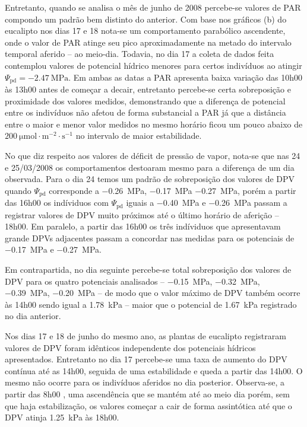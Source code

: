 \documentclass[a4paper, 12pt]{article}
\begin{document}
	Entretanto, quando se analisa o mês de junho de 2008 percebe-se valores de PAR compondo um padrão bem distinto do anterior. Com base nos gráficos (b) do eucalipto nos dias 17 e 18 nota-se um comportamento parabólico ascendente, onde o valor de PAR atinge seu pico aproximadamente na metado do intervalo temporal aferido -- ao meio-dia. Todavia, no dia 17 a coleta de dados feita contemplou valores de potencial hídrico menores para certos indivíduos ao atingir $\Psi_{\textrm{pd}}=\SI{-2.47}{\mega\pascal}$. Em ambas as datas a PAR apresenta baixa variação das 10h00 às 13h00 antes de começar a decair, entretanto percebe-se certa sobreposição e proximidade dos valores medidos, demonstrando que a diferença de potencial entre os indivíduos não afetou de forma substancial a PAR já que a distância entre o maior e menor valor medidos no mesmo horário ficou um pouco abaixo de $\SI{200}{\micro\mole\cdot\meter^{-2}\cdot\second^{-1}}$ no intervalo de maior estabilidade.
	
	No que diz respeito aos valores de déficit de pressão de vapor, nota-se que nas 24 e 25/03/2008 os comportamentos destoaram mesmo para a diferença de um dia observada. Para o dia 24 temos um padrão de sobreposição dos valores de DPV quando $\Psi_{\textrm{pd}}$ corresponde a \SI{-.26}{\mega\pascal}, \SI{-.17}{\mega\pascal} \SI{-.27}{\mega\pascal}, porém a partir das 16h00 os indíviduos com $\Psi_{\textrm{pd}}$ iguais a \SI{-.40}{\mega\pascal} e \SI{-.26}{\mega\pascal} passam a registrar valores de DPV muito próximos até o último horário de aferição -- 18h00. Em paralelo, a partir das 16h00 os três indíviduos que apresentavam grande DPVs adjacentes passam a concordar nas medidas para os potenciais de \SI{-.17}{\mega\pascal} e \SI{-.27}{\mega\pascal}.
	
	Em contrapartida, no dia seguinte percebe-se total sobreposição dos valores de DPV para os quatro potenciais analisados -- \SI{-.15}{\mega\pascal}, \SI{-.32}{\mega\pascal}, \SI{-.39}{\mega\pascal}, \SI{-.20}{\mega\pascal} -- de modo que o valor máximo de DPV também ocorre às 14h00 sendo igual a \SI{1.78}{\kilo\pascal} -- maior que o potencial de \SI{1.67}{\kilo\pascal} registrado no dia anterior.
	
	Nos dias 17 e 18 de junho do mesmo ano, as plantas de eucalipto registraram valores de DPV foram idênticos independente dos potenciais hídricos apresentados. Entretanto no dia 17 percebe-se uma taxa de aumento do DPV contínua até as 14h00, seguida de uma estabilidade e queda a partir das 14h00. O mesmo não ocorre para os indivíduos aferidos no dia posterior. Observa-se, a partir das 8h00 , uma ascendência que se mantém até ao meio dia porém, sem que haja estabilização, os valores começar a cair de forma assintótica até que o DPV atinja \SI{1.25}{\kilo\pascal} às 18h00. 
	
\end{document}
